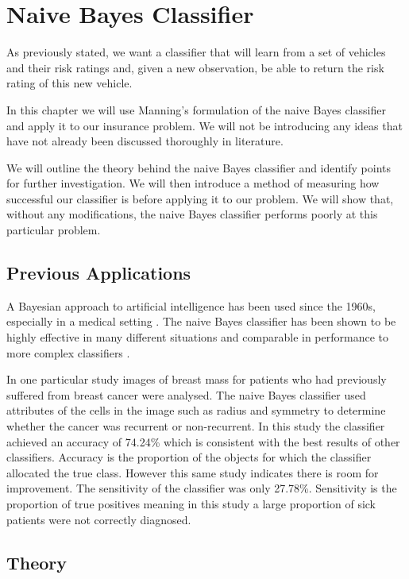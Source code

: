 \chapter{Naive Bayes Classifier}

As previously stated, we want a classifier that will learn from a set of vehicles and their risk ratings and, given a new observation, be able to return the risk rating of this new vehicle.

In this chapter we will use Manning's \cite{Manning08} formulation of the naive Bayes classifier and apply it to our insurance problem.
We will not be introducing any ideas that have not already been discussed thoroughly in literature.

We will outline the theory behind the naive Bayes classifier and identify points for further investigation.
We will then introduce a method of measuring how successful our classifier is before applying it to our problem.
We will show that, without any modifications, the naive Bayes classifier performs poorly at this particular problem.

\section{Previous Applications}
A Bayesian approach to artificial intelligence has been used since the 1960s, especially in a medical setting \cite{Russell03}.
The naive Bayes classifier has been shown to be highly effective in many different situations and comparable in performance to more complex classifiers \cite{Ashari13}.

In one particular study \cite{Dumitru09} images of breast mass for patients who had previously suffered from breast cancer were analysed.
The naive Bayes classifier used attributes of the cells in the image such as radius and symmetry to determine whether the cancer was recurrent or non-recurrent.
In this study the classifier achieved an accuracy of 74.24\% which is consistent with the best results of other classifiers.
Accuracy is the proportion of the objects for which the classifier allocated the true class.
However this same study indicates there is room for improvement.
The sensitivity of the classifier was only 27.78\%.
Sensitivity is the proportion of true positives meaning in this study a large proportion of sick patients were not correctly diagnosed.

\section{Theory}

